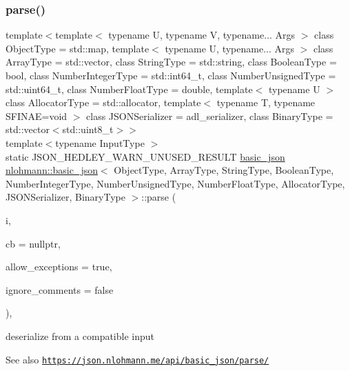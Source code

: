 \subsubsection{\texorpdfstring{parse()}{parse()}\hspace{0.1cm}{\footnotesize\ttfamily [1/2]}}
{\footnotesize\ttfamily template$<$template$<$ typename U, typename V, typename... Args $>$ class Object\+Type = std\+::map, template$<$ typename U, typename... Args $>$ class Array\+Type = std\+::vector, class String\+Type  = std\+::string, class Boolean\+Type  = bool, class Number\+Integer\+Type  = std\+::int64\+\_\+t, class Number\+Unsigned\+Type  = std\+::uint64\+\_\+t, class Number\+Float\+Type  = double, template$<$ typename U $>$ class Allocator\+Type = std\+::allocator, template$<$ typename T, typename S\+F\+I\+N\+A\+E=void $>$ class J\+S\+O\+N\+Serializer = adl\+\_\+serializer, class Binary\+Type  = std\+::vector$<$std\+::uint8\+\_\+t$>$$>$ \\
template$<$typename Input\+Type $>$ \\
static J\+S\+O\+N\+\_\+\+H\+E\+D\+L\+E\+Y\+\_\+\+W\+A\+R\+N\+\_\+\+U\+N\+U\+S\+E\+D\+\_\+\+R\+E\+S\+U\+LT \hyperlink{classnlohmann_1_1basic__json}{basic\+\_\+json} \hyperlink{classnlohmann_1_1basic__json}{nlohmann\+::basic\+\_\+json}$<$ Object\+Type, Array\+Type, String\+Type, Boolean\+Type, Number\+Integer\+Type, Number\+Unsigned\+Type, Number\+Float\+Type, Allocator\+Type, J\+S\+O\+N\+Serializer, Binary\+Type $>$\+::parse (\begin{DoxyParamCaption}\item[{Input\+Type \&\&}]{i,  }\item[{const \hyperlink{classnlohmann_1_1basic__json_a0273d074462644e5d5a7ff313ad0d742}{parser\+\_\+callback\+\_\+t}}]{cb = {\ttfamily nullptr},  }\item[{const bool}]{allow\+\_\+exceptions = {\ttfamily true},  }\item[{const bool}]{ignore\+\_\+comments = {\ttfamily false} }\end{DoxyParamCaption})\hspace{0.3cm}{\ttfamily [inline]}, {\ttfamily [static]}}



deserialize from a compatible input 

\begin{DoxySeeAlso}{See also}
\href{https://json.nlohmann.me/api/basic_json/parse/}{\tt https\+://json.\+nlohmann.\+me/api/basic\+\_\+json/parse/} 
\end{DoxySeeAlso}
\mbox{\label{classnlohmann_1_1basic__json_ad832c70af0989389a9a104c21d2d1c5c}} 

